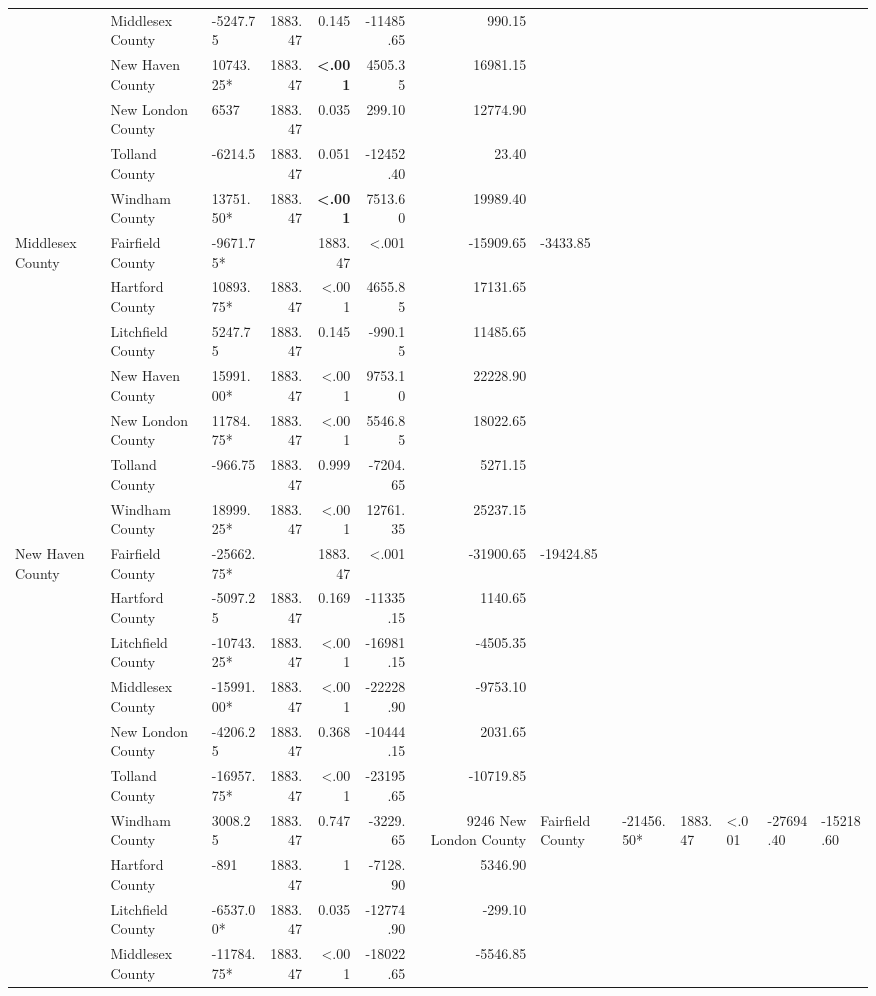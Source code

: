 \documentclass[12pt]{article}
\begin{document}
\begin{table}[htbp]
{\begin{tabular}{lllrrrr}
  & Middlesex County & -5247.75 & 1883.47 & 0.145 & -11485.65 & 990.15 \\
  & New Haven County & 10743.25* & 1883.47 & \textbf{<.001} & 4505.35 & 16981.15 \\
  & New London County & 6537 & 1883.47 & 0.035 & 299.10 & 12774.90 \\
  & Tolland County & -6214.5 & 1883.47 & 0.051 & -12452.40 & 23.40 \\
  & Windham County & 13751.50* & 1883.47 & \textbf{<.001}  & 7513.60 & 19989.40 \\
  \midrule
  Middlesex County & Fairfield County & -9671.75* &  & 1883.47 & <.001 & -15909.65 & -3433.85 \\
  & Hartford County & 10893.75* & 1883.47 & <.001 & 4655.85 & 17131.65 \\
  & Litchfield County & 5247.75 & 1883.47 & 0.145 & -990.15 & 11485.65 \\
  & New Haven County & 15991.00* & 1883.47 & <.001 & 9753.10 & 22228.90 \\
  & New London County & 11784.75* & 1883.47 & <.001 & 5546.85 & 18022.65 \\
  & Tolland County & -966.75 & 1883.47 & 0.999 & -7204.65 & 5271.15 \\
  & Windham County & 18999.25* & 1883.47 & <.001 & 12761.35 & 25237.15 \\
  \midrule
  New Haven County & Fairfield County & -25662.75* &  & 1883.47 & <.001 & -31900.65 & -19424.85 \\
  & Hartford County & -5097.25 & 1883.47 & 0.169 & -11335.15 & 1140.65 \\
  & Litchfield County & -10743.25* & 1883.47 & <.001 & -16981.15 & -4505.35 \\
  & Middlesex County & -15991.00* & 1883.47 & <.001 & -22228.90 & -9753.10 \\
  & New London County & -4206.25 & 1883.47 & 0.368 & -10444.15 & 2031.65 \\
  & Tolland County & -16957.75* & 1883.47 & <.001 & -23195.65 & -10719.85 \\
  & Windham County & 3008.25 & 1883.47 & 0.747 & -3229.65 & 9246
  \midrule
  New London County & Fairfield County & -21456.50* & 1883.47 & <.001 & -27694.40 & -15218.60 \\
  & Hartford County & -891 & 1883.47 & 1 & -7128.90 & 5346.90 \\
  & Litchfield County & -6537.00* & 1883.47 & 0.035 & -12774.90 & -299.10 \\
  & Middlesex County & -11784.75* & 1883.47 & <.001 & -18022.65 & -5546.85 \\

\end{tabular}}
\end{table}
\end{document}
